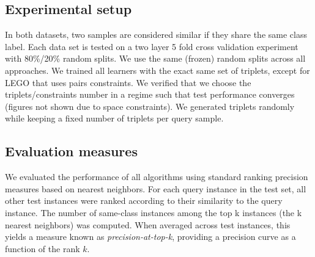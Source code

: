\documentclass{article}
\begin{document}
\subsection{Experimental setup}
In both datasets, two samples are considered similar if they share the same class label. Each data set is tested on a two layer 5 fold cross validation experiment with 80\%/20\% random splits. We use the same (frozen) random splits across all approaches. We trained all learners with the exact same set of triplets, except for LEGO that uses pairs constraints. We verified that we choose the triplets/constraints number in a regime such that test performance converges (figures not shown due to space constraints). We generated triplets randomly while keeping a fixed number of triplets per query sample.

\subsection{Evaluation measures}
We evaluated the performance of all algorithms using standard ranking precision measures based on nearest neighbors. For each query instance in the test set, all other test instances were ranked according to their similarity to the query instance. The number of same-class instances
among the top k instances (the k nearest neighbors) was computed. When averaged across test
instances, this yields a measure known as \textit{precision-at-top-k},
providing a precision curve as a function of the rank $k$.

\end{document}
